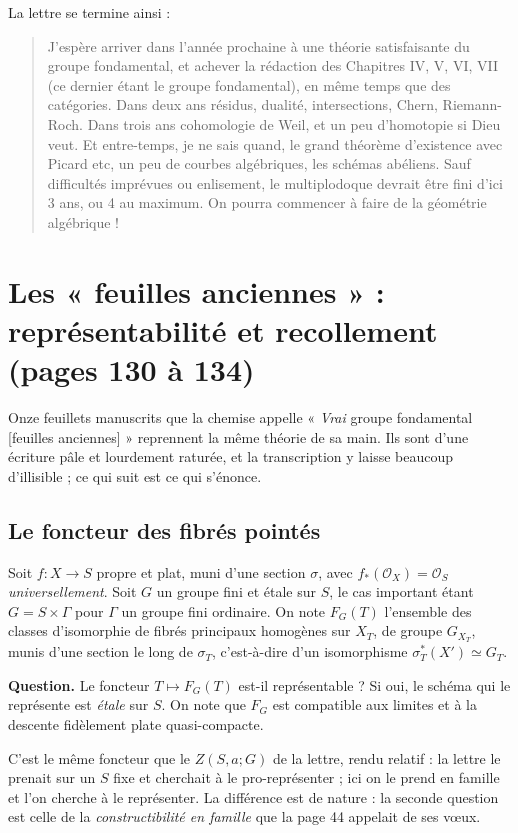 \documentclass[11pt,a4paper]{article}
\begin{document}
La lettre se termine ainsi :

\begin{quote}
J'espère arriver dans l'année prochaine à une théorie satisfaisante du groupe
fondamental, et achever la rédaction des Chapitres IV, V, VI, VII (ce dernier
étant le groupe fondamental), en même temps que des catégories. Dans deux ans
résidus, dualité, intersections, Chern, Riemann-Roch. Dans trois ans
cohomologie de Weil, et un peu d'homotopie si Dieu veut. Et entre-temps, je ne
sais quand, le grand théorème d'existence avec Picard etc, un peu de courbes
algébriques, les schémas abéliens. Sauf difficultés imprévues ou enlisement, le
multiplodoque devrait être fini d'ici 3 ans, ou 4 au maximum. On pourra
commencer à faire de la géométrie algébrique !
\end{quote}

\section*{Les « feuilles anciennes » : représentabilité et recollement (pages 130 à 134)}

Onze feuillets manuscrits que la chemise appelle « \emph{Vrai} groupe
fondamental [feuilles anciennes] » reprennent la même théorie de sa main. Ils
sont d'une écriture pâle et lourdement raturée, et la transcription y laisse
beaucoup d'illisible ; ce qui suit est ce qui s'énonce.

\subsection*{Le foncteur des fibrés pointés}

Soit $f : X \to S$ propre et plat, muni d'une section $\sigma$, avec
$f_{*}(\mathcal{O}_{X}) = \mathcal{O}_{S}$ \emph{universellement}. Soit $G$ un
groupe fini et étale sur $S$, le cas important étant $G = S \times \Gamma$
pour $\Gamma$ un groupe fini ordinaire. On note $F_{G}(T)$ l'ensemble des classes d'isomorphie de fibrés principaux
homogènes sur $X_{T}$, de groupe $G_{X_{T}}$, munis d'une section le long de
$\sigma_{T}$, c'est-à-dire d'un isomorphisme
$\sigma_{T}^{*}(X') \simeq G_{T}$.

\textbf{Question.} Le foncteur $T \mapsto F_{G}(T)$ est-il représentable ? Si
oui, le schéma qui le représente est \emph{étale} sur $S$. On note que
$F_{G}$ est compatible aux limites et à la descente fidèlement plate
quasi-compacte.

C'est le même foncteur que le $Z(S,a;G)$ de la lettre, rendu relatif : la
lettre le prenait sur un $S$ fixe et cherchait à le pro-représenter ; ici on le
prend en famille et l'on cherche à le représenter. La différence est de
nature : la seconde question est celle de la \emph{constructibilité en famille}
que la page 44 appelait de ses vœux.
\end{document}
